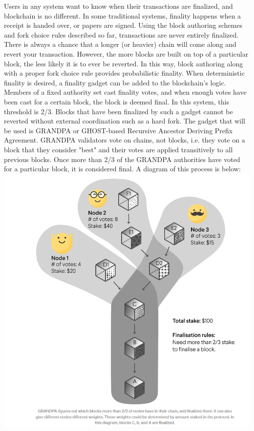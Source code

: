 Users in any system want to know when their transactions are finalized, and blockchain is no different. In some traditional systems, finality happens when a receipt is handed over, or papers are signed. Using the block authoring schemes and fork choice rules described so far, transactions are never entirely finalized. There is always a chance that a longer (or heavier) chain will come along and revert your transaction. However, the more blocks are built on top of a particular block, the less likely it is to ever be reverted. In this way, block authoring along with a proper fork choice rule provides probabilistic finality. When deterministic finality is desired, a finality gadget can be added to the blockchain's logic. Members of a fixed authority set cast finality votes, and when enough votes have been cast for a certain block, the block is deemed final. In this system, this threshold is 2/3. Blocks that have been finalized by such a gadget cannot be reverted without external coordination such as a hard fork. The gadget that will be used is GRANDPA or GHOST-based Recursive Ancestor Deriving Prefix Agreement.
GRANDPA validators vote on chains, not blocks, i.e. they vote on a block that they consider "best" and their votes are applied transitively to all previous blocks. Once more than 2/3 of the GRANDPA authorities have voted for a particular block, it is considered final. A diagram of this process is below:\\

\includegraphics[width=\linewidth]{figures/finality.png} \\

